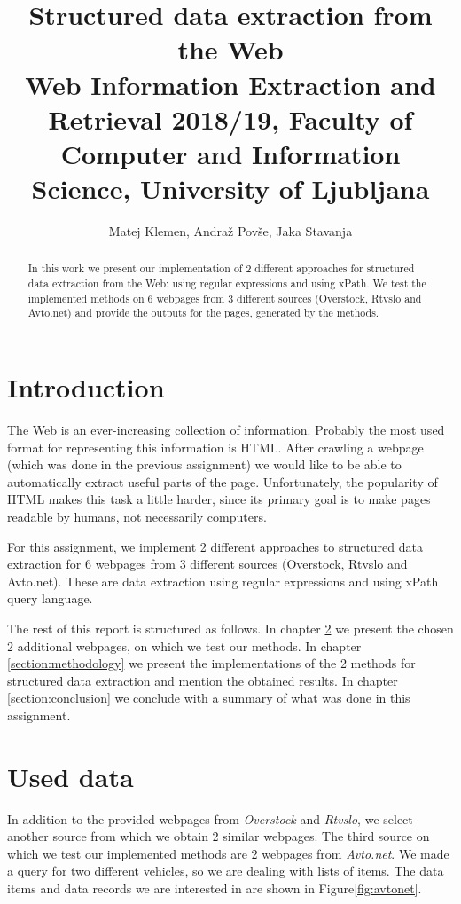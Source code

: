 \documentclass[9pt]{IEEEtran}
\title{\vspace{0ex} %
Structured data extraction from the Web
\\ \normalsize{Web Information Extraction and Retrieval 2018/19, Faculty of Computer and Information Science, University of Ljubljana}}
\author{ %
Matej Klemen, Andraž Povše, Jaka Stavanja
\vspace{-4.0ex}
}
\begin{document}
\maketitle

\begin{abstract}
In this work we present our implementation of 2 different approaches for structured data extraction from the Web: using regular expressions and using xPath.
We test the implemented methods on 6 webpages from 3 different sources (Overstock, Rtvslo and Avto.net) and provide the outputs for the pages, generated by the methods.
\end{abstract}

\section{Introduction}

The Web is an ever-increasing collection of information. 
Probably the most used format for representing this information is HTML.
After crawling a webpage (which was done in the previous assignment) we would like to be able to automatically extract useful parts of the page.
Unfortunately, the popularity of HTML makes this task a little harder, since its primary goal is to make pages readable by humans, not necessarily computers.

For this assignment, we implement 2 different approaches to structured data extraction for 6 webpages from 3 different sources (Overstock, Rtvslo and Avto.net). 
These are data extraction using regular expressions and using xPath query language.

The rest of this report is structured as follows. 
In chapter \ref{section:used-data} we present the chosen 2 additional webpages, on which we test our methods.
In chapter \ref{section:methodology} we present the implementations of the 2 methods for structured data extraction and mention the obtained results.
In chapter \ref{section:conclusion} we conclude with a summary of what was done in this assignment.

\section{Used data}
\label{section:used-data}

In addition to the provided webpages from \textit{Overstock} and \textit{Rtvslo}, we select another source from which we obtain 2 similar webpages.
The third source on which we test our implemented methods are 2 webpages from \textit{Avto.net}. 
We made a query for two different vehicles, so we are dealing with lists of items.
The data items and data records we are interested in are shown in Figure\ref{fig:avtonet}.
\end{document}
